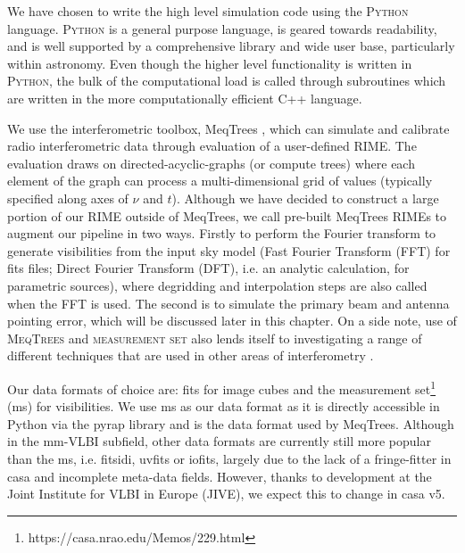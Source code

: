We have chosen to write the high level simulation code using the \textsc{Python} language. \textsc{Python} is a general purpose language, is geared towards readability, and is well supported by a comprehensive library and wide user base, particularly within astronomy. Even though the higher level functionality is written in \textsc{Python}, the bulk of the computational load is called through subroutines which are written in the more computationally efficient {\sc C++} language.


We use the interferometric toolbox, {\sc MeqTrees} \citep{Noordam_2010}, which can simulate and calibrate radio interferometric data through evaluation of a user-defined RIME. The evaluation draws on directed-acyclic-graphs (or compute trees) where each element of the graph can process a multi-dimensional grid of values (typically specified along axes of $\nu$ and $t$).
Although we have decided to construct a large portion of our RIME outside of {\sc MeqTrees}, we call pre-built {\sc MeqTrees} RIMEs to augment our pipeline in two ways. Firstly to perform the Fourier transform  to generate visibilities from the input sky model (Fast Fourier Transform (FFT) for fits files; Direct Fourier Transform (DFT), i.e. an analytic calculation, for parametric sources), where degridding and interpolation steps are also called when the FFT is used. The second is to simulate the primary beam and antenna pointing error, which will be discussed later in this chapter. On a side note, use of \textsc{MeqTrees} and \textsc{measurement set} also lends itself to investigating a range of different techniques that are used in other areas of interferometry \citep*[e.g.][]{Smirnov_2015}.


Our data formats of choice are: {\sc fits} for image cubes and the {\sc measurement set}\footnote{https://casa.nrao.edu/Memos/229.html} ({\sc ms}) for visibilities. We use {\sc ms} as our data format as it is directly accessible in {\sc Python} via the {\sc pyrap} library and is the data format used by {\sc MeqTrees}. Although in the mm-VLBI subfield, other data formats are currently still more popular than the {\sc ms}, i.e. {\sc fitsidi}, {\sc uvfits} or {\sc iofits}, largely due to the lack of a fringe-fitter in {\sc casa} and incomplete meta-data fields. However,  thanks to development at the Joint Institute for VLBI in Europe (JIVE), we expect this to change in {\sc casa v5}. 


